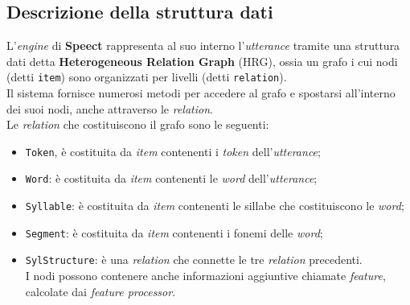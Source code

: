 \subsection{Descrizione della struttura dati}
L'\textit{engine} di \textbf{Speect} rappresenta al suo interno l'\textit{utterance} tramite una struttura dati detta
\textbf{Heterogeneous Relation Graph} (HRG), ossia un grafo i cui nodi (detti \texttt{item}) sono organizzati per livelli
(detti \texttt{relation}). \\ Il sistema fornisce numerosi metodi per accedere al grafo e spostarsi all'interno dei suoi nodi,
anche attraverso le \textit{relation}. \\ Le \textit{relation} che costituiscono il grafo sono le seguenti:
\begin{itemize}
\item \texttt{Token}, è costituita da \textit{item} contenenti i \textit{token} dell'\textit{utterance};
\item \texttt{Word}: è costituita da \textit{item} contenenti le \textit{word} dell'\textit{utterance};
\item \texttt{Syllable}: è costituita da \textit{item} contenenti le sillabe che costituiscono le \textit{word};
\item \texttt{Segment}: è costituita da \textit{item} contenenti i fonemi delle \textit{word};
\item \texttt{SylStructure}: è una \textit{relation} che connette le tre \textit{relation} precedenti. \\
I nodi possono contenere anche informazioni aggiuntive chiamate \textit{feature}, calcolate dai \textit{feature processor}.
\end{itemize}

